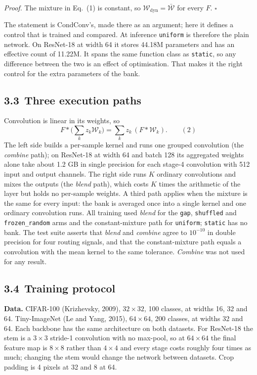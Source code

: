 \documentclass{article}
\begin{document}
\emph{Proof.} 
The mixture in Eq.~(1) is constant, so
$\mathcal{W}_{\text{dyn}}=\bar{\mathcal{W}}$ for every $F$.
 $\square$


The statement is CondConv's, made there as an argument; here it defines a
control that is trained and compared. At inference \texttt{uniform} is
therefore the plain network. On
ResNet-18 at width 64 it stores 44.18M parameters and has an effective
count of 11.22M. It spans the same function class as \texttt{static}, so
any difference between the two is an effect of optimisation. That makes it
the right control for the extra parameters of the bank.

\subsection*{3.3 Three execution paths}

Convolution is linear in its weights, so
$$F*\Big(\sum_k z_k\mathcal{W}_k\Big)=\sum_k z_k\,(F*\mathcal{W}_k).\qquad(2)$$
The left side builds a per-sample kernel and runs one grouped convolution
(the \emph{combine} path); on ResNet-18 at width 64 and batch 128 its
aggregated weights alone take about 1.2 GB in single
precision for each stage-4 convolution with 512 input and output channels.
The right side runs $K$ ordinary convolutions and mixes the outputs (the
\emph{blend} path), which costs $K$ times the arithmetic of the layer but
holds no per-sample weights. A third path applies when the mixture is the
same for every input: the bank is averaged once into a single kernel and
one ordinary convolution runs. All training used \emph{blend} for the
\texttt{gap}, \texttt{shuffled} and \texttt{frozen\_random} arms and the
constant-mixture path for \texttt{uniform}; \texttt{static} has no bank.
The test suite asserts that \emph{blend} and \emph{combine} agree to
$10^{-10}$ in double precision for four routing signals, and that the
constant-mixture path equals a convolution with the mean kernel to the same
tolerance. \emph{Combine} was not used for any result.

\subsection*{3.4 Training protocol}

\textbf{Data.}  CIFAR-100 (Krizhevsky, 2009), $32\times32$, 100
classes, at widths 16, 32 and 64. Tiny-ImageNet (Le and Yang, 2015),
$64\times64$, 200 classes, at widths 32 and 64. Each backbone has the
same architecture on both datasets. For ResNet-18 the stem is a
$3\times3$ stride-1 convolution with no max-pool, so at $64\times64$ the
final feature map is $8\times8$ rather than $4\times4$ and every stage
costs roughly four times as much; changing the stem would change the
network between datasets. Crop
padding is 4 pixels at 32 and 8 at 64.
\end{document}
